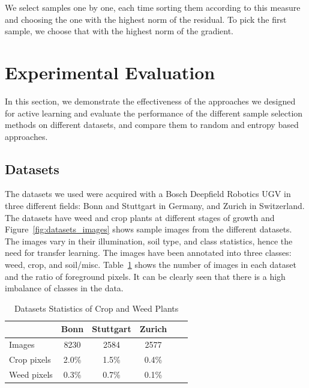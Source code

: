 \documentclass[letterpaper, 10 pt, conference]{ieeeconf}  %
\begin{document}
We select samples one by one, each time sorting them according to this measure and choosing the one with the highest norm of the residual. To pick the first sample, we choose that with the highest norm of the gradient.



\section{Experimental Evaluation}
\label{sec:exp}

In this section, we demonstrate the effectiveness of the approaches we designed for active learning and evaluate the performance of the different sample selection methods on different datasets, and compare them to random and entropy based approaches.

\subsection{Datasets}

The datasets we used were acquired with a Bosch Deepfield Robotics UGV in three different fields: Bonn and Stuttgart in Germany, and Zurich in Switzerland. The datasets have weed and crop plants at different stages of growth and Figure~\ref{fig:datasets_images} shows sample images from the different datasets. The images vary in their illumination, soil type, and class statistics, hence the need for transfer learning. The images have been annotated into three classes:  weed, crop, and soil/misc.  Table~\ref{tab:datasets_stats} shows the number of images in each dataset and the ratio of foreground pixels. It can be clearly seen that there is a high imbalance of classes in the data.



    \begin{table}
       \vspace{1em}
        \centering
        \caption{Datasets Statistics of Crop and Weed Plants}
        \begin{tabular}{@{}lccccc@{}} 
            \toprule
              & Bonn & Stuttgart & Zurich \\ 
            \midrule 
    		  Images  & 8230 & 2584 & 2577 \\ \addlinespace
    		  Crop pixels & 2.0\% & 1.5\% & 0.4\%  \\ \addlinespace
    		  Weed pixels & 0.3\% & 0.7\% & 0.1\%  \\    
            \bottomrule
        \end{tabular}
        \label{tab:datasets_stats}
           \vspace{-2em}
    \end{table}
     
\end{document}

